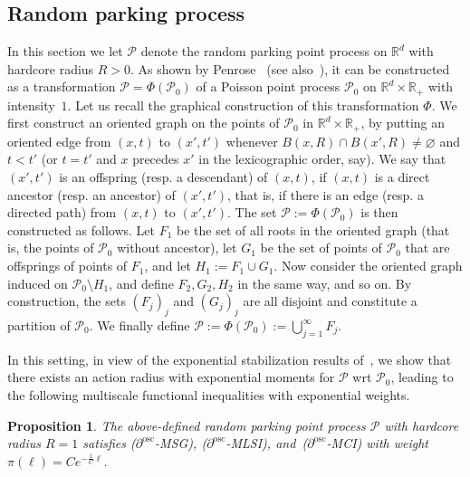 \documentclass[11pt]{article}
\newtheorem{prop}[theo]{Proposition}
\theoremstyle{definition}
\numberwithin{equation}{section}
\numberwithin{figure}{section}
\numberwithin{table}{section}
\newcommand{\R}{\mathbb R}
\newcommand{\Pc}{\mathcal P}
\newcommand{\osc}{\partial^{\mathrm{osc}}}
\begin{document}
\subsection{Random parking process}\label{chap:RPM}
In this section we let $\Pc$ denote the random parking point process on $\R^d$ with hardcore radius $R>0$. As shown by Penrose~\cite{Penrose-01} (see also~\cite[Section~2.1]{Gloria-Penrose-13}), it can be constructed as a transformation $\Pc=\Phi(\Pc_0)$ of a Poisson point process $\Pc_0$ on $\R^d\times\R_+$ with intensity~$1$. Let us recall the graphical construction of this transformation $\Phi$. We first construct an oriented graph on the points of $\Pc_0$ in $\R^d\times\R_+$, by putting an oriented edge from $(x,t)$ to $(x',t')$ whenever $B(x,R)\cap B(x',R)\ne\varnothing$ and $t<t'$ (or $t=t'$ and $x$ precedes $x'$ in the lexicographic order, say). We say that $(x',t')$ is an offspring (resp. a descendant) of $(x,t)$, if $(x,t)$ is a direct ancestor (resp. an ancestor) of $(x',t')$, that is, if there is an edge (resp. a directed path) from $(x,t)$ to $(x',t')$. The set $\Pc:=\Phi(\Pc_0)$ is then constructed as follows. Let $F_1$ be the set of all roots in the oriented graph (that is, the points of $\Pc_0$ without ancestor), let $G_1$ be the set of points of $\Pc_0$ that are offsprings of points of $F_1$, and let $H_1:=F_1\cup G_1$. Now consider the oriented graph induced on $\Pc_0\setminus H_1$, and define $F_2,G_2,H_2$ in the same way, and so on. By construction, the sets $(F_j)_j$ and $(G_j)_j$ are all disjoint and constitute a partition of $\Pc_0$. We finally define $\Pc:=\Phi(\Pc_0):=\bigcup_{j=1}^\infty F_j$.

In this setting, in view of the exponential stabilization results of~\cite{Schreiber-Penrose-Yukich-07}, we show that there exists an action radius with exponential moments for $\Pc$ wrt $\Pc_0$, leading to the following multiscale functional inequalities with exponential weights.

\begin{prop}\label{prop:rpm}
The above-defined random parking point process $\Pc$ with hardcore radius $R=1$ satisfies
\emph{($\osc$-MSG)}, \emph{($\osc$-MLSI)}, and~\emph{($\osc$-MCI)} with weight $\pi(\ell)=Ce^{-\frac1{C}\ell}$.
\end{prop}
\end{document}
